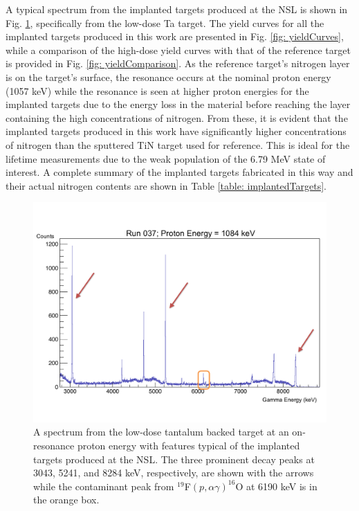 A typical spectrum from the implanted targets produced at the NSL is shown in Fig. \ref{fig: implantedSpectrum}, specifically from the low-dose Ta target. The yield curves for all the implanted targets produced in this work are presented in Fig. \ref{fig: yieldCurves}, while a comparison of the high-dose yield curves with that of the reference target is provided in Fig. \ref{fig: yieldComparison}. As the reference target's nitrogen layer is on the target's surface, the resonance occurs at the nominal proton energy (1057 keV) while the resonance is seen at higher proton energies for the implanted targets due to the energy loss in the material before reaching the layer containing the high concentrations of nitrogen. From these, it is evident that the implanted targets produced in this work have significantly higher concentrations of nitrogen than the sputtered TiN target used for reference. This is ideal for the lifetime measurements due to the weak population of the 6.79 MeV state of interest. A complete summary of the implanted targets fabricated in this way and their actual nitrogen contents are shown in Table \ref{table: implantedTargets}. 



\begin{figure}
\includegraphics[width=\linewidth]{figures/typicalSpectrum.pdf}
\caption{A spectrum from the low-dose tantalum backed target at an on-resonance proton energy with features typical of the implanted targets produced at the NSL. The three prominent decay peaks at 3043, 5241, and 8284 keV, respectively, are shown with the arrows while the contaminant peak from $^{19}$F$\left( p, \alpha\gamma \right)^{16}$O at 6190 keV is in the orange box.  }
\label{fig: implantedSpectrum}
\end{figure}


